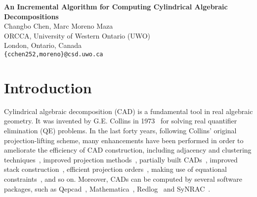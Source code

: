 \documentclass[10pt]{article}
\newcommand{\CAD}{{CAD}}
\begin{document}
\begin{center}
  {\Large\bf 
    An Incremental Algorithm for Computing Cylindrical Algebraic Decompositions
  }
\mbox{}\\[11pt]
{\large
  Changbo Chen, Marc Moreno Maza
}
\mbox{}\\[5pt] 
ORCCA, University of Western Ontario (UWO) \\
London, Ontario, Canada \\
{\tt \{cchen252,moreno\}@csd.uwo.ca}\\[5pt]
\end{center} 

\begin{abstract}
In this paper, we propose 
an incremental algorithm for 
computing cylindrical algebraic decompositions.
The algorithm consists of two parts: 
computing a complex cylindrical tree 
and refining this complex tree into a 
cylindrical tree in real space. 
The incrementality comes from 
the first part of the algorithm, 
where a complex cylindrical tree
is constructed by refining a previous complex cylindrical tree
with a polynomial constraint. 
We have implemented our algorithm in Maple. 
The experimentation shows that 
the proposed  algorithm outperforms existing ones 
for many examples taken from the literature.
\end{abstract}

\section{Introduction}

Cylindrical algebraic decomposition (CAD)
is a fundamental tool in real algebraic geometry. 
It was invented by G.E. Collins in 1973~\cite{col75}
for solving real quantifier elimination (QE) problems.
In the last forty years, following Collins' original 
projection-lifting scheme, 
many enhancements have been performed in order to 
ameliorate the efficiency of CAD construction, 
including adjacency and clustering techniques~\cite{Arnon84b},
improved projection methods~\cite{scott88,hong90,CavinesJohnson98,brown01}, 
partially built {\CAD}s~\cite{ch91,scott93,adam00},
improved stack construction~\cite{Collins02},
efficient projection orders~\cite{Dolzmann04}, 
making use of equational 
constraints~\cite{Collins98, McCallum2001, Brown05, McCallum2009}, 
and so on.
Moreover, CADs can be computed 
by several software packages, such as 
{\sc Qepcad}~\cite{QEPCAD, Bro03}, {\sf Mathematica}~\cite{adam00, adam06}, 
{\sf Redlog}~\cite{Dolzmann96} and {\sf SyNRAC}~\cite{Iwane09}.
\end{document}
